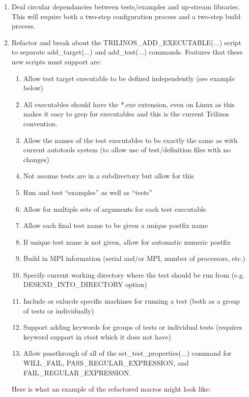 \documentclass[pdf,ps2pdf,11pt]{SANDreport}
\begin{document}
\begin{enumerate}
{}\item Deal circular dependancies between tests/examples and
up-stream libraries.  This will require both a two-step configuration
process and a two-step build process.

{}\item Refactor and break about the TRILINOS\_ADD\_EXECUTABLE(...) 
script to separate add\_target(...) and add\_test(...) commands.
Features that these new scripts must support are:

  \begin{enumerate}
  \item Allow test target executable to be defined independently (see example below)
  \item All executables should have the *.exe extension, even on Linux
    as this makes it easy to grep for executables and this is the
    current Trilinos convention. 
  \item Allow the names of the test executables to be exactly the same
    as with current autotools system (to allow use of test/definition
    files with no changes)
  \item Not assume tests are in a subdirectory but allow for this
  \item Run and test ``examples'' as well as ``tests''
  \item Allow for multiple sets of arguments for each test executable
  \item Allow each final test name to be given a unique postfix name
  \item If unique test name is not given, allow for automatic numeric postfix
  \item Build in MPI information (serial and/or MPI, number of processors, etc.)
  \item Specify current working directory where the test should be run from
    (e.g. DESEND\_INTO\_DIRECTORY option)
  \item Include or exlucde specific machines for running a test (both
    as a group of tests or individually)
  \item Support adding keywords for groups of tests or individual tests
    (requires keyword support in ctest which it does not have)
  \item Allow passthrough of all of the set\_test\_properties(...) command
    for WILL\_FAIL, PASS\_REGULAR\_EXPRESSION, and FAIL\_REGULAR\_EXPRESSION.
  \end{enumerate}

Here is what an example of the refactored macros might look like:


\end{enumerate}
\end{document}
